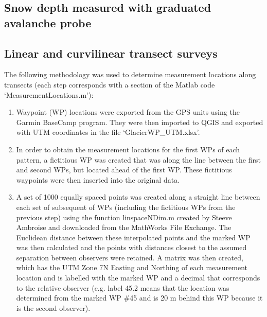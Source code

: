 \documentclass{sfuthesis}
\begin{document}
\begin{appendices}
\section{Snow depth measured with graduated avalanche probe}
\subsection{Linear and curvilinear transect surveys}

 The following methodology was used to determine measurement locations along transects (each step corresponds with a section of the Matlab code `MeasurementLocations.m'): 
\begin{enumerate}
	\item Waypoint (WP) locations were exported from the GPS units using the Garmin BaseCamp program. They were then imported to QGIS and exported with UTM coordinates in the file `GlacierWP\_UTM.xlsx'. 
	\item In order to obtain the measurement locations for the first WPs of each pattern, a fictitious WP was created that was along the line between the first and second WPs, but located ahead of the first WP. These fictitious waypoints were then inserted into the original data. 
	\item A set of 1000 equally spaced points was created along a straight line between each set of subsequent of WPs (including the fictitious WPs from the previous step) using the function linspaceNDim.m created by Steeve Ambroise and downloaded from the MathWorks File Exchange. The Euclidean distance between these interpolated points and the marked WP was then calculated and the points with distances closest to the assumed separation between observers were retained. A matrix was then created, which has the UTM Zone 7N Easting and Northing of each measurement location and is labelled with the marked WP and a decimal that corresponds to the relative observer (e.g. label 45.2 means that the location was determined from the marked WP \#45 and is 20 m behind this WP because it is the second observer). 
\end{enumerate}


\end{appendices}
\end{document}
